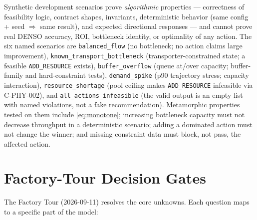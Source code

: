 \documentclass[11pt,a4paper]{article}
\begin{document}
Synthetic development scenarios prove \emph{algorithmic} properties ---
correctness of feasibility logic, contract shapes, invariants, deterministic
behavior (same config + seed $\Rightarrow$ same result), and expected
directional responses --- and cannot prove real DENSO accuracy, ROI,
bottleneck identity, or optimality of any action. The six named scenarios
are \texttt{balanced\_flow} (no bottleneck; no action claims large
improvement), \texttt{known\_transport\_bottleneck} (transporter-constrained
state; a feasible \texttt{ADD\_RESOURCE} exists), \texttt{buffer\_overflow}
(queue at/over capacity; buffer-family and hard-constraint tests),
\texttt{demand\_spike} (p90 trajectory stress; capacity interaction),
\texttt{resource\_shortage} (pool ceiling makes \texttt{ADD\_RESOURCE}
infeasible via C-PHY-002), and \texttt{all\_actions\_infeasible} (the valid
output is an empty list with named violations, not a fake recommendation).
Metamorphic properties tested on them include \cref{eq:monotone}; increasing
bottleneck capacity must not decrease throughput in a deterministic
scenario; adding a dominated action must not change the winner; and missing
constraint data must block, not pass, the affected action.

\section{Factory-Tour Decision Gates}\label{sec:tour}

The Factory Tour (2026-09-11) resolves the core unknowns. Each question maps
to a specific part of the model:
\end{document}
